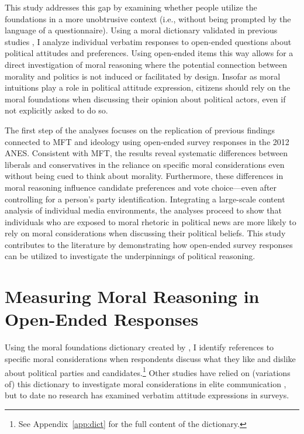 \documentclass[12pt]{article}
\begin{document}
This study addresses this gap by examining whether people utilize the foundations in a more unobtrusive context (i.e., without being prompted by the language of a questionnaire). Using a moral dictionary validated in previous studies \citep[e.g.,][]{graham2009liberals}, I analyze individual verbatim responses to open-ended questions about political attitudes and preferences. Using open-ended items this way allows for a direct investigation of moral reasoning where the potential connection between morality and politics is not induced or facilitated by design. Insofar as moral intuitions play a role in political attitude expression, citizens should rely on the moral foundations when discussing their opinion about political actors, even if not explicitly asked to do so. 

The first step of the analyses focuses on the replication of previous findings connected to MFT and ideology using open-ended survey responses in the 2012 ANES. Consistent with MFT, the results reveal systematic differences between liberals and conservatives in the reliance on specific moral considerations even without being cued to think about morality. Furthermore, these differences in moral reasoning influence candidate preferences and vote choice---even after controlling for a person's party identification. Integrating a large-scale content analysis of individual media environments, the analyses proceed to show that individuals who are exposed to moral rhetoric in political news are more likely to rely on moral considerations when discussing their political beliefs. This study contributes to the literature by demonstrating how open-ended survey responses can be utilized to investigate the underpinnings of political reasoning.


\section*{Measuring Moral Reasoning in Open-Ended Responses}

Using the moral foundations dictionary created by \citet{graham2009liberals}, I identify references to specific moral considerations when respondents discuss what they like and dislike about political parties and candidates.\footnote{See Appendix~\ref{app:dict} for the full content of the dictionary.} Other studies have relied on (variations of) this dictionary to investigate moral considerations in elite communication \citep[e.g. in news media coverage about stem cell research,][]{clifford2013words}, but to date no research has examined verbatim attitude expressions in surveys.
\end{document}
